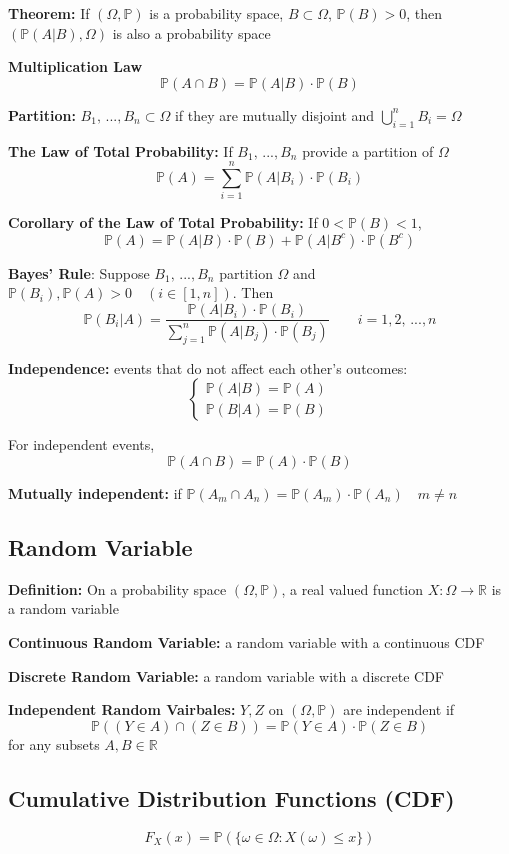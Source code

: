 \documentclass[12pt]{article}
\renewcommand{\P}{\mathbb{P}}
\newcommand{\R}{\mathbb{R}}
\begin{document}
\textbf{Theorem:} If $(\Omega, \P)$ is a probability space, $B \subset \Omega$, $\P(B) > 0$, then $(\P(A | B), \Omega)$ is also a probability space

\textbf{Multiplication Law}
\[\P(A \cap B) = \P(A | B) \cdot \P(B)\]

\textbf{Partition:} $B_1, \, ..., B_n \subset \Omega$ if they are mutually disjoint and $\bigcup_{i=1}^n B_i = \Omega$

\textbf{The Law of Total Probability:} If $B_1, \, ..., B_n$ provide a partition of $\Omega$ 
\[\P(A) = \sum_{i=1}^n \P(A | B_i) \cdot \P(B_i)\]

\textbf{Corollary of the Law of Total Probability:} If $0 < \P(B) <1$, 
\[\P(A) = \P(A | B) \cdot \P(B) + \P(A |B^c) \cdot \P(B^c)\]

\textbf{Bayes' Rule}: Suppose $B_1, \,..., B_n$ partition $\Omega$ and $\P(B_i), \P(A) > 0 \quad (i \in [1, n])$. Then 
\[\P(B_i | A) = \frac{\P(A | B_i)\cdot \P(B_i)}{\sum_{j=1}^n \P(A | B_j) \cdot \P(B_j)}\qquad i = 1, 2, \,..., n\]

\textbf{Independence:} events that do not affect each other's outcomes:
\[\begin{cases}
    \P(A | B) = \P(A)\\
    \P(B | A) = \P(B)
\end{cases}\]

For independent events, 
\[\P(A \cap B) = \P(A) \cdot \P(B)\]

\textbf{Mutually independent:} if $\P(A_m \cap A_n) = \P(A_m) \cdot \P(A_n) \quad m\neq n$

\subsection{Random Variable}
\textbf{Definition:} On a probability space $(\Omega, \P)$, a real valued function $X : \Omega \to \R$ is a random variable

\textbf{Continuous Random Variable:} a random variable with a continuous CDF

\textbf{Discrete Random Variable:} a random variable with a discrete CDF

\textbf{Independent Random Vairbales:} $Y, Z$ on $(\Omega, \P)$ are independent if 
\[\P((Y \in A) \cap (Z \in B)) = \P(Y \in A) \cdot \P(Z\in B)\]
for any subsets $A, B \in \R$

\subsection{Cumulative Distribution Functions (CDF)}
\[F_X(x) = \P(\{\omega \in \Omega: X(\omega) \leq x\})\]
\end{document}
